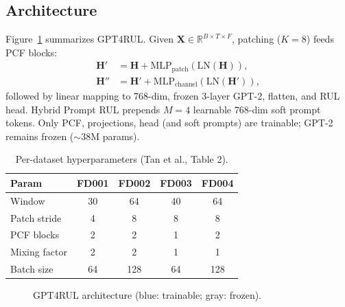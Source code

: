 \documentclass[10pt,twocolumn]{article}
\begin{document}
\subsection{Architecture}

Figure~\ref{fig:arch} summarizes GPT4RUL. Given $\mathbf{X} \in \mathbb{R}^{B \times T \times F}$, patching ($K{=}8$) feeds PCF blocks:
\begin{align}
  \mathbf{H}' &= \mathbf{H} + \mathrm{MLP}_{\mathrm{patch}}(\mathrm{LN}(\mathbf{H})), \\
  \mathbf{H}'' &= \mathbf{H}' + \mathrm{MLP}_{\mathrm{channel}}(\mathrm{LN}(\mathbf{H}')),
\end{align}
followed by linear mapping to 768-dim, frozen 3-layer GPT-2, flatten, and RUL head.
Hybrid Prompt RUL prepends $M{=}4$ learnable 768-dim soft prompt tokens.
Only PCF, projections, head (and soft prompts) are trainable; GPT-2 remains frozen ($\sim$38M params).

\begin{table}[t]
  \centering
  \caption{Per-dataset hyperparameters (Tan et al., Table 2).}
  \label{tab:hparams}
  \scriptsize
  \begin{tabular}{@{}lcccc@{}}
    \toprule
    Param & FD001 & FD002 & FD003 & FD004 \\
    \midrule
    Window & 30 & 64 & 40 & 64 \\
    Patch stride & 4 & 8 & 8 & 8 \\
    PCF blocks & 2 & 2 & 1 & 2 \\
    Mixing factor & 2 & 2 & 1 & 1 \\
    Batch size & 64 & 128 & 64 & 128 \\
    \bottomrule
  \end{tabular}
\end{table}

\begin{figure}[t]
  \centering
  \caption{GPT4RUL architecture (blue: trainable; gray: frozen).}
  \label{fig:arch}
\end{figure}
\end{document}
